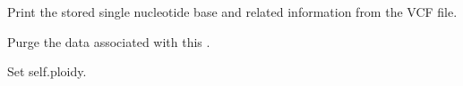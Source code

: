\documentclass[letterpaper,10pt,english]{sphinxmanual}
\begin{document}
\begin{fulllineitems}
\begin{fulllineitems}
Print the stored single nucleotide base and related
information from the VCF file.

\end{fulllineitems}


\begin{fulllineitems}
\label{vcf:libPoMo.vcf.NucBase.purge}
Purge the data associated with this {\hyperref[vcf:libPoMo.vcf.NucBase]{}}.

\end{fulllineitems}


\begin{fulllineitems}
\label{vcf:libPoMo.vcf.NucBase.set_ploidy}
Set self.ploidy.

\end{fulllineitems}


\end{fulllineitems}

\end{document}

